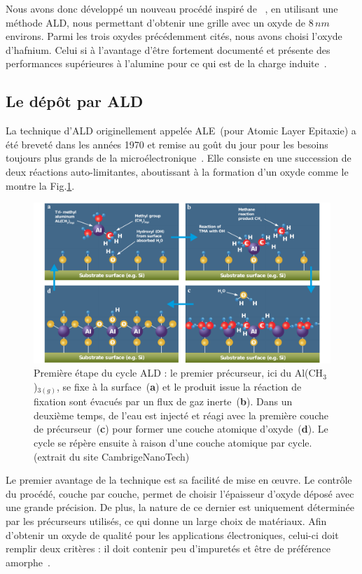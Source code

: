 Nous avons donc développé un nouveau procédé inspiré de~\cite{Biercuk2003} , en utilisant une méthode ALD, nous permettant d'obtenir une grille avec un oxyde de $8\,nm$ environs. Parmi les trois oxydes précédemment cités, nous avons choisi l'oxyde d'hafnium. Celui si à l'avantage d'être fortement documenté et présente des performances supérieures à l'alumine pour ce qui est de la charge induite~\cite{Biercuk2003}. 




\subsection{Le dép\^ot par ALD}
La technique d'ALD originellement appelée ALE~(pour Atomic Layer Epitaxie) a été breveté dans les années 1970 et remise au goût du jour pour les besoins toujours plus grands de la microélectronique~\cite{Leskelae2003}. Elle consiste en une succession de deux réactions auto-limitantes, aboutissant à la formation d'un oxyde comme le montre la Fig.\ref{ALD}.

\begin{figure}
\centering \includegraphics[scale=0.45]{Fabrication/ALD/ALD.pdf}
\caption{Première étape du cycle ALD : le premier précurseur, ici du Al(CH$_3$)$_{3(g)}$, se fixe à la surface~(\textbf{a}) et le produit issue la réaction de fixation sont évacués par un flux de gaz inerte~(\textbf{b}). Dans un deuxième temps, de l'eau est injecté et réagi avec la première couche de précurseur~(\textbf{c}) pour former une couche atomique d'oxyde~(\textbf{d}). Le cycle se répère ensuite à raison d'une couche atomique par cycle. (extrait du site CambrigeNanoTech)}
\label{ALD}
\end{figure}


Le premier avantage de la technique est sa facilité de mise en œuvre. Le contrôle du procédé, couche par couche, permet de choisir l'épaisseur d'oxyde déposé avec une grande précision. De plus, la nature de ce dernier est uniquement déterminée par les précurseurs utilisés, ce qui donne un large choix de matériaux. Afin d'obtenir un oxyde de qualité pour les applications électroniques, celui-ci doit remplir deux critères : il doit contenir peu d'impuretés et être de préférence amorphe~\cite{Kim2003}.

